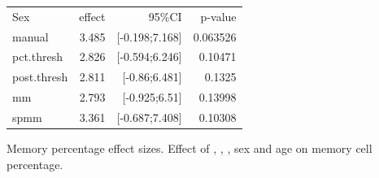 \begin{table}
\begin{tabular}{lrrr}
\rowcolor{Gray}
Sex              & effect & 95\%CI         & p-value\\
manual           & 3.485  & [-0.198;7.168] & 0.063526\\
pct.thresh       & 2.826  & [-0.594;6.246] & 0.10471\\
post.thresh      & 2.811  & [-0.86;6.481]  & 0.1325\\
mm               & 2.793  & [-0.925;6.51]  & 0.13998\\
spmm             & 3.361  & [-0.687;7.408] & 0.10308\\
\end{tabular} 
{Memory percentage effect sizes.}
{
Effect of , , , sex and age on memory cell percentage.
}
\end{table}


